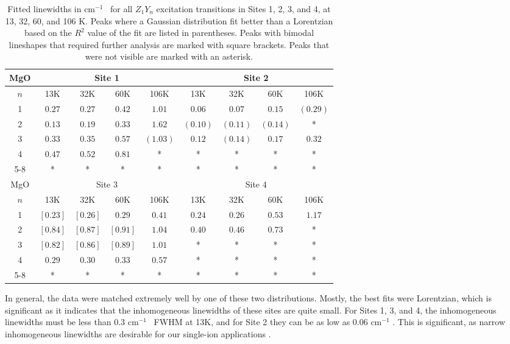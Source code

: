 \documentclass[12pt]{report}
\newcommand{\wn}[1][ ]{cm$^{-1}$#1}
\begin{document}
\begin{table}[t]
  \centering
  \begin{tabular}{|c| c| c | c | c | c | c | c | c|}
    \hline
    MgO & \multicolumn{4}{c|}{Site 1} & \multicolumn{4}{c|}{Site 2} \\
    \hline
    $n$ & 13K & 32K & 60K & 106K & 13K & 32K & 60K & 106K \\
    \hline
    1 & $0.27$ & $0.27$ & $0.42$ & $1.01$   & $0.06$   & $0.07$   & $0.15$   & $(0.29)$ \\
    2 & $0.13$ & $0.19$ & $0.33$ & $1.62$   & $(0.10)$ & $(0.11)$ & $(0.14)$ & *      \\
    3 & $0.33$ & $0.35$ & $0.57$ & $(1.03)$ & $0.12$   & $(0.14)$ & $0.17$   & $0.32$ \\
    4 & $0.47$ & $0.52$ & $0.81$ & *        & *        & *        & *        & *      \\
    5-8 & * & * & * & * & * & * & * & * \\
    \hline \hline
    MgO & \multicolumn{4}{c|}{Site 3} & \multicolumn{4}{c|}{Site 4} \\
    \hline
    $n$ & 13K & 32K & 60K & 106K & 13K & 32K & 60K & 106K \\
    \hline
    1 & $[0.23]$ & $[0.26]$ & $0.29$ & $0.41$ & $0.24$ & $0.26$ & $0.53$ & $1.17$ \\
    2 & $[0.84]$ & $[0.87]$ & $[0.91]$ & $1.04$ & $0.40$ & $0.46$ & $0.73$ & *      \\
    3 & $[0.82]$ & $[0.86]$ & $[0.89]$ & $1.01$ & *      & *      & *      & *      \\
    4 & $0.29$ & $0.30$ & $0.33$ & $0.57$ & *      & *      & *      & *      \\
    5-8 & * & * & * & * & * & * & * & * \\
    \hline
  \end{tabular}
  \caption{Fitted linewidths in \wn\ for all $Z_{1}Y_{n}$ excitation transitions in Sites 1, 2, 3, and 4, at 13, 32, 60, and 106 K. Peaks where a Gaussian distribution fit better than a Lorentzian based on the $R^{2}$ value of the fit are listed in parentheses. Peaks with bimodal lineshapes that required further analysis are marked with square brackets. Peaks that were not visible are marked with an asterisk.}
  \label{tab:mgolinewidths}
\end{table}

In general, the data were matched extremely well by one of these two distributions. Mostly, the best fits were Lorentzian, which is significant as it indicates that the inhomogeneous linewidths of these sites are quite small. For Sites 1, 3, and 4, the inhomogeneous linewidths must be less than 0.3 \wn\ FWHM at 13K, and for Site 2 they can be as low as 0.06 \wn. This is significant, as narrow inhomogeneous linewidths are desirable for our single-ion applications \cite{Dibos2018}.
\end{document}
